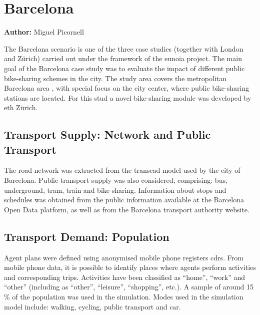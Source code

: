 \chapter{Barcelona}
\label{ch:barcelona}
\hfill \textbf{Author:} Miguel Picornell


The Barcelona scenario is one of the three case studies (together with London and Zürich) carried out under the framework of the \gls{eunoia} project. The main goal of the Barcelona case study was to evaluate the impact of different public bike-sharing schemes in the city. The study area covers the metropolitan Barcelona area , with special focus on the city center, where public bike-sharing stations are located. For this stud a novel bike-sharing module was developed by \gls{eth} Zürich.

\section{Transport Supply: Network and Public Transport}
The road network was extracted from the \gls{transcad} model used by the city of Barcelona. Public transport supply was also considered, comprising: bus, underground, tram, train and bike-sharing. Information about stops and schedules was obtained from the public information available at the Barcelona Open Data platform, as well as from the Barcelona transport authority website. 

\section{Transport Demand: Population} 
Agent plans were defined using anonymised mobile phone registers \glspl{cdr}. From mobile phone data, it is possible to identify places where agents perform activities and corresponding trips. Activities have been classified as ``home'', ``work'' and ``other'' (including as ``other'', ``leisure'', ``shopping'', etc.). A sample of around 15\,\% of the population was used in the simulation. Modes used  in the simulation model include: walking, cycling, public transport and car.

